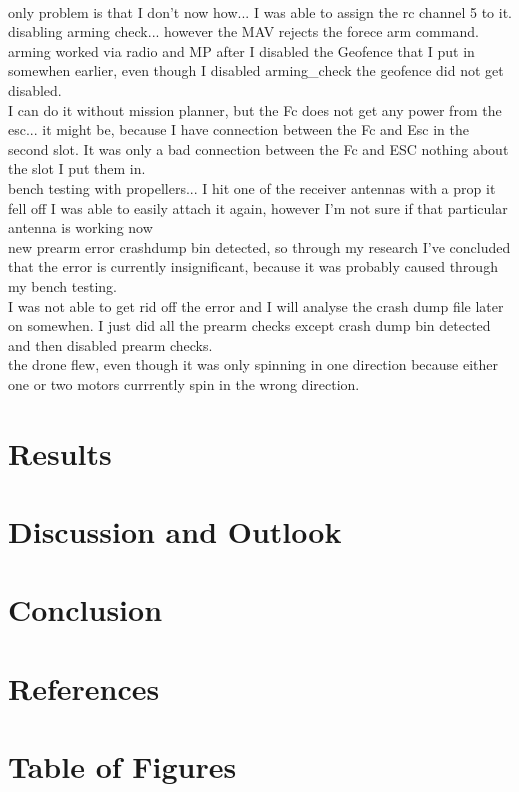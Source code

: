 \documentclass{article}
\newcommand{\comment}[1]{}
\begin{document}
	\\ only problem is that I don't now how... I was able to assign the rc channel 5 to it. 
	\\ disabling arming check... however the MAV rejects the forece arm command. 
	\\ arming worked via radio and MP after I disabled the Geofence that I put in somewhen earlier, even though I disabled arming\_check the geofence did not get disabled.
	\\ I can do it without mission planner, but the Fc does not get any power from the esc... it might be, because I have connection between the Fc and Esc in the second slot. It was only a bad connection between the Fc and ESC nothing about the slot I put them in. 
	\\ bench testing with propellers... I hit one of the receiver antennas with a prop it fell off I was able to easily attach it again, however I'm not sure if that particular antenna is working now
	\\ new prearm error crashdump bin detected, so through my research I've concluded that the error is currently insignificant, because it was probably caused through my bench testing.
	\\ I was not able to get rid off the error and I will analyse the crash dump file later on somewhen. I just did all the prearm checks except crash dump bin detected and then disabled prearm checks. 
	\\ the drone flew, even though it was only spinning in one direction because either one or two motors currrently spin in the wrong direction.
	
	
	
	\section{Results}
	\section{Discussion and Outlook}
	\section{Conclusion}
	
	\section{References}
	\printbibliography[
	heading=bibintoc,
	title={Bibliography}
	]	
	\section{Table of Figures}
	\comment{(short table on which every figure description with the page number is listed)}
\end{document}
